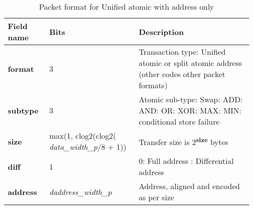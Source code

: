 \begin{table}[htp]
  \centering
  \caption{Packet format for Unified atomic with address only}
  \label{tab:te_datadx0y6}
  \begin{tabulary}{\textwidth}{|l|p{38mm}|p{92mm}|}
    \hline
    {\bf Field name} & {\bf Bits} & {\bf Description} \\
    \hline
    \textbf{format} & 	3	& Transaction type: Unified atomic or split atomic address\newline	
		(other codes other packet formats)\\
    \hline
    \textbf{subtype} & 	3	& Atomic sub-type: Swap: ADD: AND: OR: XOR: MAX: MIN: conditional store failure\\	
    \hline
    \textbf{size} & max(1, clog2(clog2( \textit{data\_width\_p}/8 + 1)) & Transfer size is 2\textsuperscript{\textbf{size}} bytes\\
    \hline
    \textbf{diff} & 1 & 0: Full address : Differential address\\
    \hline
    \textbf{address} &  \textit{daddress\_width\_p} & Address, aligned and encoded as per size \\
    \hline
  \end{tabulary}
\end{table}


